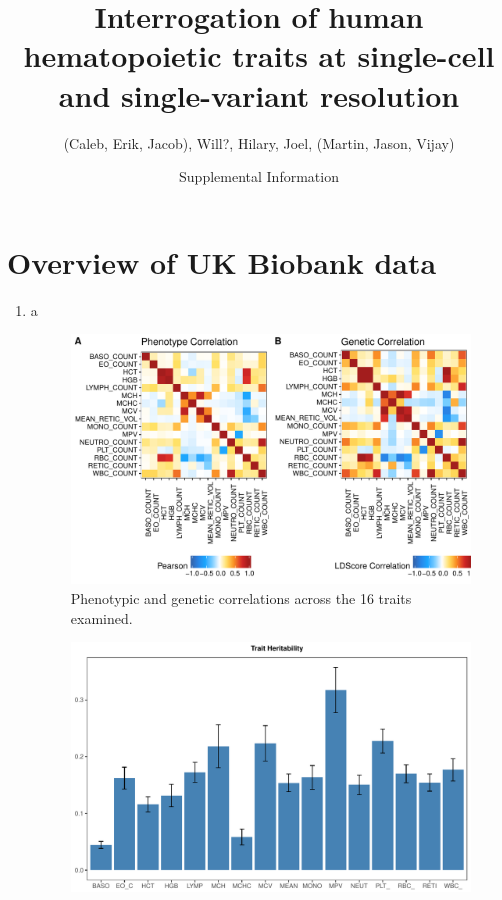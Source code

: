 \documentclass{article}\usepackage[]{graphicx}\usepackage[]{color}
\title{Interrogation of human hematopoietic traits at single-cell and single-variant resolution}
\date{Supplemental Information}
\author{(Caleb, Erik, Jacob), Will?, Hilary, Joel, (Martin, Jason, Vijay)}
\makeatletter
\def\maxwidth{ %
  \ifdim\Gin@nat@width>\linewidth
    \linewidth
  \else
    \Gin@nat@width
  \fi
}
\newenvironment{knitrout}{}{} %
\makeatother
\begin{document}
\maketitle
\section*{Overview of UK Biobank data}
\begin{enumerate}[label=(\Alph*)]
\item 
a



\begin{knitrout}
\color{fgcolor}\begin{figure}[H]

{\centering \includegraphics[width=\maxwidth]{figure/correlationPlots-1} 

}

\caption[Phenotypic and genetic correlations across the 16 traits examined]{Phenotypic and genetic correlations across the 16 traits examined. }\label{fig:correlationPlots}
\end{figure}


\end{knitrout}


\begin{knitrout}
\color{fgcolor}\begin{figure}[H]

{\centering \includegraphics[width=\maxwidth]{figure/heritabilityPlots-1} 

}
\end{figure}
\end{knitrout}
\end{enumerate}
\end{document}

